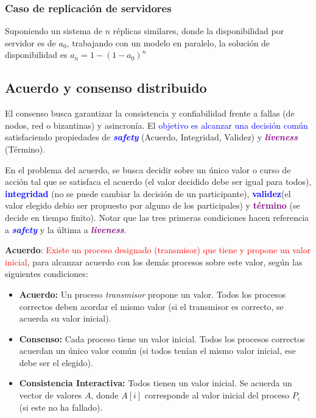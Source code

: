 \subsubsection{Caso de replicación de servidores}
Suponiendo un sistema de $n$ réplicas similares, donde la disponibilidad por servidor es de $a_0$, \textcolor{Sepia}{trabajando con un modelo en paralelo}, la solución de disponibilidad es $a_n=1-(1-a_0)^n$

\subsection{Acuerdo y consenso distribuido}
El consenso busca garantizar la consistencia y confiabilidad frente a fallas (de nodos, red o bizantinas) y asincronía. El \textcolor{blue}{objetivo es alcanzar una decisión común} satisfaciendo propiedades de \textcolor{blue}{\textbf{\textit{safety}}} (Acuerdo, Integridad, Validez) y \textcolor{purple}{\textbf{\textit{liveness}}} (Término).

En el problema del acuerdo, \textcolor{Sepia}{se busca decidir sobre un único valor o curso de acción tal que se satisfaca el }acuerdo (el valor decidido debe ser igual para todos), \textcolor{blue}{\textbf{integridad}} (no se puede cambiar la decisión de un participante), \textcolor{blue}{\textbf{validez}}(el valor elegido debio ser propuesto por alguno de los participales) y \textcolor{purple}{\textbf{término}} (se decide en tiempo finito). Notar que las tres primeras condiciones hacen referencia a \textcolor{blue}{\textbf{\textit{safety}}} y la última a \textcolor{purple}{\textbf{\textit{liveness}}}.
 
\textbf{Acuerdo}: \textcolor{red}{Existe un proceso designado (transmisor) que tiene y propone un valor inicial}, para alcanzar acuerdo con los demás procesos sobre este valor, según las siguientes condiciones:
\begin{itemize}
    \item \textbf{Acuerdo:} Un proceso \textit{transmisor} propone un valor. Todos los procesos correctos deben acordar el mismo valor (si el transmisor es correcto, se acuerda su valor inicial).
    \item \textbf{Consenso:} Cada proceso tiene un valor inicial. Todos los procesos correctos acuerdan un único valor común (si todos tenían el mismo valor inicial, ese debe ser el elegido).
    \item \textbf{Consistencia Interactiva:} Todos tienen un valor inicial. Se acuerda un vector de valores $A$, donde $A[i]$ corresponde al valor inicial del proceso $P_i$ (si este no ha fallado).
\end{itemize}

